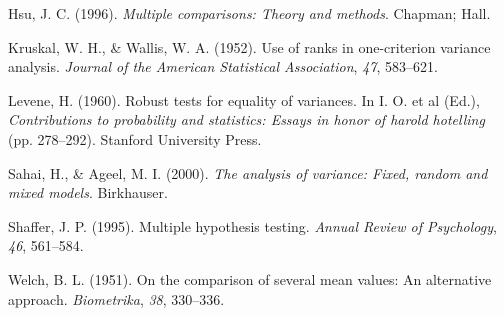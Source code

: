 \documentclass[
  a4paper,
]{book}
\newlength{\cslhangindent}
\newlength{\cslentryspacingunit} %
\newenvironment{CSLReferences}[2] %
 {%
  \setlength{\parindent}{0pt}
  \ifodd #1
  \let\oldpar\par
  \def\par{\hangindent=\cslhangindent\oldpar}
  \fi
  \setlength{\parskip}{#2\cslentryspacingunit}
 }%
 {}
\begin{document}
\begin{CSLReferences}{1}{0}
\leavevmode{}%
Hsu, J. C. (1996). \emph{Multiple comparisons: Theory and methods}.
Chapman; Hall.

\leavevmode{}%
Kruskal, W. H., \& Wallis, W. A. (1952). Use of ranks in one-criterion
variance analysis. \emph{Journal of the American Statistical
Association}, \emph{47}, 583--621.

\leavevmode{}%
Levene, H. (1960). Robust tests for equality of variances. In I. O. et
al (Ed.), \emph{Contributions to probability and statistics: Essays in
honor of harold hotelling} (pp. 278--292). Stanford University Press.

\leavevmode{}%
Sahai, H., \& Ageel, M. I. (2000). \emph{The analysis of variance:
Fixed, random and mixed models}. Birkhauser.

\leavevmode{}%
Shaffer, J. P. (1995). Multiple hypothesis testing. \emph{Annual Review
of Psychology}, \emph{46}, 561--584.

\leavevmode{}%
Welch, B. L. (1951). On the comparison of several mean values: An
alternative approach. \emph{Biometrika}, \emph{38}, 330--336.

\end{CSLReferences}
\end{document}
